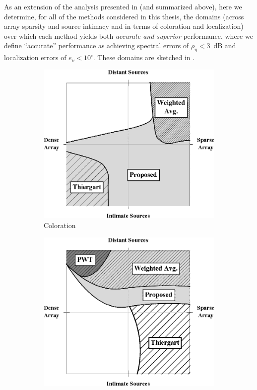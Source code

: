 As an extension of the analysis presented in  (and summarized above), here we determine, for all of the methods considered in this thesis, the domains (across array sparsity and source intimacy and in terms of coloration and localization) over which each method yields both \textit{accurate and superior} performance, where we define ``accurate'' performance as achieving spectral errors of $\rho_\eta < 3$~dB and localization errors of $e_\nu < 10^\circ$.
These domains are sketched in .

\begin{figure}[t]
	\centering
	\begin{subfigure}[b]{0.49\textwidth}
		\includegraphics[width=\textwidth]{11_conclusions/figures/Coloration_Region_Plot}
		\caption{Coloration}
		\label{fig:11_Conclusions:Region_Plots:Coloration}
	\end{subfigure}
	\hfill
	\begin{subfigure}[b]{0.49\textwidth}
		\includegraphics[width=\textwidth]{11_conclusions/figures/Localization_Region_Plot}

\end{subfigure}
\end{figure}
